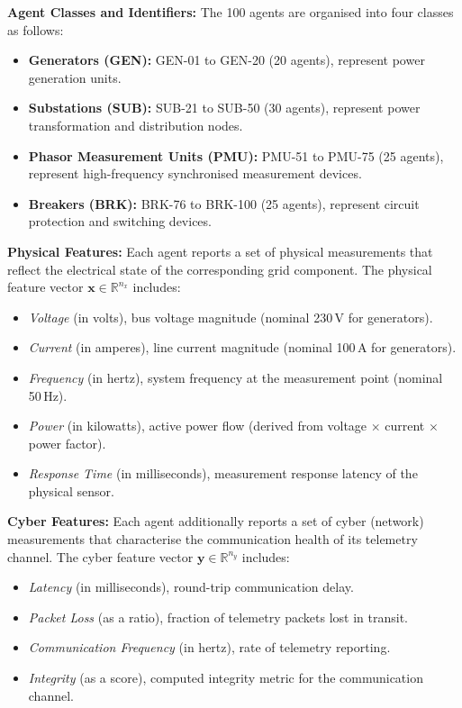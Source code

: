\par \vspace{0.35cm}
\noindent
\textbf{Agent Classes and Identifiers:} The 100 agents are organised into four classes as follows:
\begin{itemize}
    \item \textbf{Generators (GEN):} GEN-01 to GEN-20 (20 agents), represent power generation units.
    \item \textbf{Substations (SUB):} SUB-21 to SUB-50 (30 agents), represent power transformation and distribution nodes.
    \item \textbf{Phasor Measurement Units (PMU):} PMU-51 to PMU-75 (25 agents), represent high-frequency synchronised measurement devices.
    \item \textbf{Breakers (BRK):} BRK-76 to BRK-100 (25 agents), represent circuit protection and switching devices.
\end{itemize}

\par \vspace{0.35cm}
\noindent
\textbf{Physical Features:} Each agent reports a set of physical measurements that reflect the electrical state of the corresponding grid component. The physical feature vector $\mathbf{x} \in \mathbb{R}^{n_x}$ includes:
\begin{itemize}
    \item \textit{Voltage} (in volts), bus voltage magnitude (nominal 230\,V for generators).
    \item \textit{Current} (in amperes), line current magnitude (nominal 100\,A for generators).
    \item \textit{Frequency} (in hertz), system frequency at the measurement point (nominal 50\,Hz).
    \item \textit{Power} (in kilowatts), active power flow (derived from voltage $\times$ current $\times$ power factor).
    \item \textit{Response Time} (in milliseconds), measurement response latency of the physical sensor.
\end{itemize}

\par \vspace{0.35cm}
\noindent
\textbf{Cyber Features:} Each agent additionally reports a set of cyber (network) measurements that characterise the communication health of its telemetry channel. The cyber feature vector $\mathbf{y} \in \mathbb{R}^{n_y}$ includes:
\begin{itemize}
    \item \textit{Latency} (in milliseconds), round-trip communication delay.
    \item \textit{Packet Loss} (as a ratio), fraction of telemetry packets lost in transit.
    \item \textit{Communication Frequency} (in hertz), rate of telemetry reporting.
    \item \textit{Integrity} (as a score), computed integrity metric for the communication channel.
\end{itemize}

